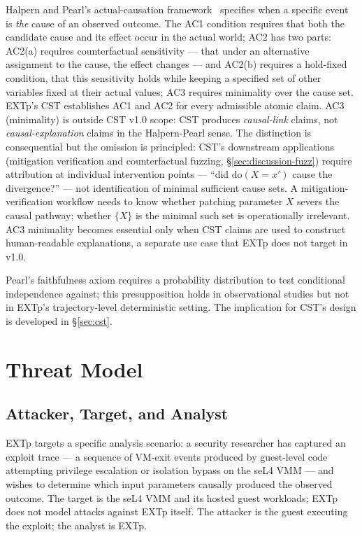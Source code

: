 \documentclass[conference]{IEEEtran}
\newcommand{\dox}[1]{\text{do}(X{=}#1)}
\begin{document}
Halpern and Pearl's actual-causation
framework~\cite{halpern2005causes} specifies when a specific event
is \emph{the} cause of an observed outcome. The AC1 condition
requires that both the candidate cause and its effect occur in the
actual world; AC2 has two parts: AC2(a) requires counterfactual
sensitivity --- that under an alternative assignment to the cause,
the effect changes --- and AC2(b) requires a hold-fixed condition,
that this sensitivity holds while keeping a specified set of other
variables fixed at their actual values; AC3 requires minimality over
the cause set. EXTp's CST establishes AC1 and AC2 for every
admissible atomic claim. AC3 (minimality) is outside CST v1.0 scope:
CST produces \emph{causal-link} claims, not \emph{causal-explanation}
claims in the Halpern-Pearl sense. The distinction is consequential
but the omission is principled: CST's downstream applications
(mitigation verification and counterfactual fuzzing,
\S\ref{sec:discussion-fuzz}) require attribution at individual
intervention points --- ``did $\dox{x'}$ cause the divergence?'' ---
not identification of minimal sufficient cause sets. A
mitigation-verification workflow needs to know whether patching
parameter $X$ severs the causal pathway; whether $\{X\}$ is the
minimal such set is operationally irrelevant. AC3 minimality
becomes essential only when CST claims are used to construct
human-readable explanations, a separate use case that EXTp does
not target in v1.0.

Pearl's faithfulness axiom requires a probability distribution to
test conditional independence against; this presupposition holds in
observational studies but not in EXTp's trajectory-level
deterministic setting. The implication for CST's design is developed
in \S\ref{sec:cst}.

\section{Threat Model}\label{sec:threat}

\subsection*{Attacker, Target, and Analyst}

EXTp targets a specific analysis scenario: a security researcher has
captured an exploit trace --- a sequence of VM-exit events produced
by guest-level code attempting privilege escalation or isolation
bypass on the seL4 VMM --- and wishes to determine which input
parameters causally produced the observed outcome. The target is the
seL4 VMM and its hosted guest workloads; EXTp does not model attacks
against EXTp itself. The attacker is the guest executing the
exploit; the analyst is EXTp.
\end{document}
